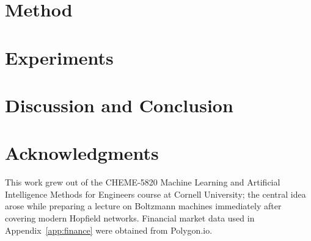 \documentclass{article}
\theoremstyle{definition}
\theoremstyle{remark}
\begin{document}
\section{Method}


\section{Experiments}


\section{Discussion and Conclusion}


\section*{Acknowledgments}
This work grew out of the CHEME-5820 Machine Learning and Artificial Intelligence Methods for Engineers course at Cornell University; the central idea arose while preparing a lecture on Boltzmann machines immediately after covering modern Hopfield networks. Financial market data used in Appendix~\ref{app:finance} were obtained from Polygon.io.




\newpage
\appendix

\end{document}
